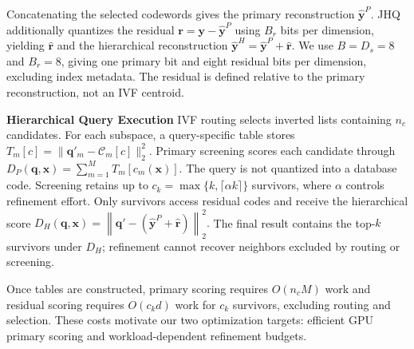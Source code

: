 Concatenating the selected codewords gives the primary reconstruction $\widehat{\mathbf{y}}^{P}$. JHQ additionally quantizes the residual $\mathbf{r}=\mathbf{y}-\widehat{\mathbf{y}}^{P}$ using $B_r$ bits per dimension, yielding $\widehat{\mathbf{r}}$ and the hierarchical reconstruction
$
\widehat{\mathbf{y}}^{H}=\widehat{\mathbf{y}}^{P}+\widehat{\mathbf{r}}.
$
We use $B=D_s=8$ and $B_r=8$, giving one primary bit and eight residual bits per dimension, excluding index metadata. The residual is defined relative to the primary reconstruction, not an IVF centroid.

\textbf{Hierarchical Query Execution}
IVF routing selects inverted lists containing $n_c$ candidates. For each subspace, a query-specific table stores $T_m[c]=\|\mathbf{q}'_m-\mathcal{C}_m[c]\|_2^2$. Primary screening scores each candidate through
$
D_P(\mathbf{q},\mathbf{x})=\sum_{m=1}^{M}T_m[c_m(\mathbf{x})]
$.
The query is not quantized into a database code. Screening retains up to $c_k=\max\{k,\lceil\alpha k\rceil\}$ survivors, where $\alpha$ controls refinement effort. Only survivors access residual codes and receive the hierarchical score
$
D_H(\mathbf{q},\mathbf{x})=\left\|\mathbf{q}'-\left(\widehat{\mathbf{y}}^{P}+\widehat{\mathbf{r}}\right)\right\|_2^2.
$
The final result contains the top-$k$ survivors under $D_H$; refinement cannot recover neighbors excluded by routing or screening.

Once tables are constructed, primary scoring requires $O(n_cM)$ work and residual scoring requires $O(c_kd)$ work for $c_k$ survivors, excluding routing and selection. These costs motivate our two optimization targets: efficient GPU primary scoring and workload-dependent refinement budgets.